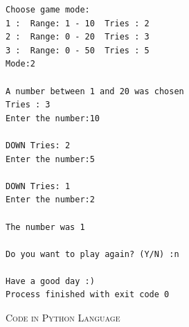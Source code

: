\documentclass{report}
\begin{document}
\hfill

\begin{verbatim}
Choose game mode:
1 :  Range: 1 - 10  Tries : 2
2 :  Range: 0 - 20  Tries : 3
3 :  Range: 0 - 50  Tries : 5
Mode:2

A number between 1 and 20 was chosen
Tries : 3
Enter the number:10

DOWN Tries: 2
Enter the number:5

DOWN Tries: 1
Enter the number:2

The number was 1

Do you want to play again? (Y/N) :n

Have a good day :)
Process finished with exit code 0
\end{verbatim}

\hfill

\break

\begin{center}
	\textsc{\LARGE{Code in Python Language}}
\end{center}

\hfill
\end{document}

